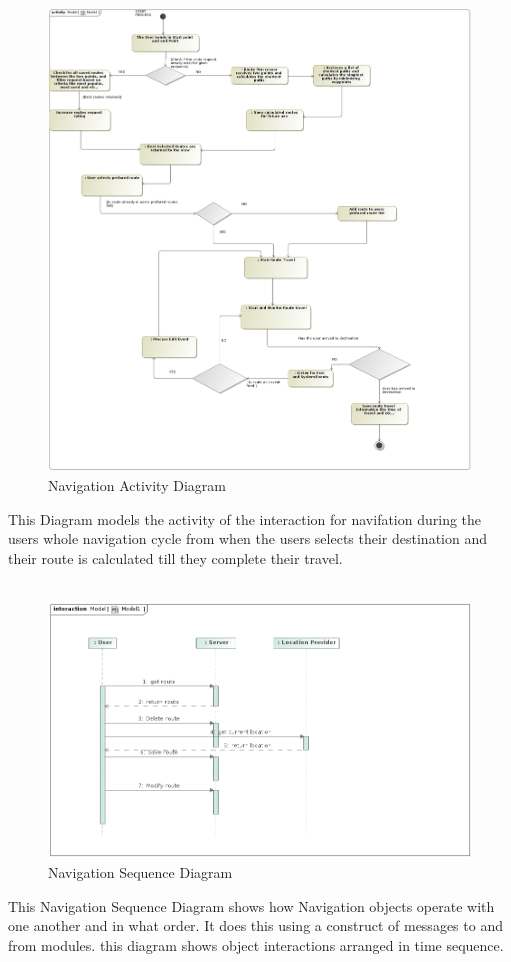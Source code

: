 \documentclass{article}
\begin{document}
				\begin{figure}[H]
					\includegraphics[scale=0.3]{Diagrams/Activity_Diagram_Navigation.JPG}
					\caption{Navigation Activity Diagram}	
				\end{figure}
				{This Diagram models the activity of the interaction for navifation during the users whole navigation cycle from when the users selects their destination and their route is calculated till they complete their travel.\\\\}
				
								\begin{figure}[H]
					\includegraphics[scale=0.5]{Diagrams/Sequence_Diagram_Navigation.JPG}
					\caption{Navigation Sequence Diagram}	
				\end{figure}
				{This Navigation Sequence Diagram shows how Navigation objects operate with one another and in what order. It does this using a construct of messages to and from modules. this diagram shows object interactions arranged in time sequence.\\\\}
				
\end{document}
